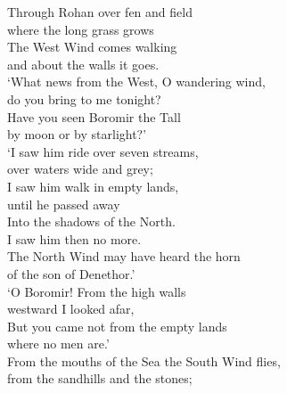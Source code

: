 
Through Rohan over fen and field \tab{}\\
where the long grass grows \tab{}\tab{}\\
The West Wind comes walking \tab{}\\
and about the walls it goes. \tab{}\tab{}\\ 
‘What news from the West, O wandering wind, \\
do you bring to me tonight? \tab{}\tab{}\\
Have you seen Boromir the Tall \tab{}\\
by moon or by starlight?’ \tab{}\tab{}\\ 
\hop
‘I saw him ride over seven streams, \\
over waters wide and grey; \tab{}\\
I saw him walk in empty lands, \\
until he passed away \tab{}\\
Into the shadows of the North. \\
I saw him then no more. \tab{}\\
The North Wind may have heard the horn \\
of the son of Denethor.’ \tab{}\\
\hop
{} ‘O Boromir! From the high walls \\
 westward I looked afar, \tab{}\\
 But you came not from the empty lands \\
 where no men are.’ \tab{}\\ 
\hops
From the mouths of the Sea the South Wind flies, \\
from the sandhills and the stones; \tab{}\\
